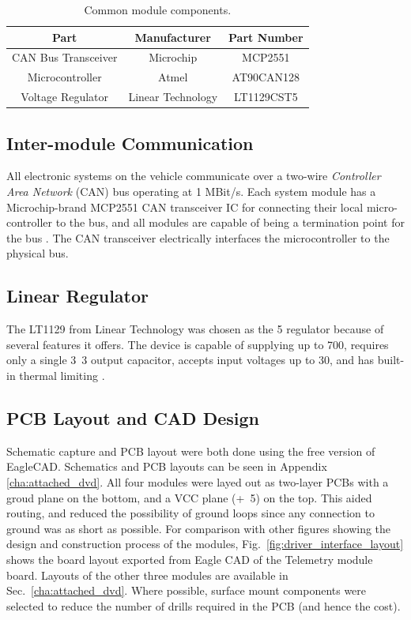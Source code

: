 \begin{table}[H]
	\caption{Common module components.}
	\label{tab:common_module_components}
	\centering
	\begin{tabular}{|c|c|c|}
		\hline 
		Part & Manufacturer & Part Number\tabularnewline 
		\hline \hline
		CAN Bus Transceiver & Microchip & MCP2551\tabularnewline \hline
		Microcontroller & Atmel & AT90CAN128\tabularnewline \hline
		Voltage Regulator & Linear Technology & LT1129CST5\tabularnewline		
		\hline
	\end{tabular}
\end{table}

\subsection{Inter-module Communication\label{sec:inter_module_communication}}


All electronic systems on the vehicle communicate over a two-wire \emph{Controller Area Network} (CAN) bus operating at 1 MBit/s. Each system module has a Microchip-brand MCP2551 CAN transceiver IC for connecting their local micro-controller to the bus, and all modules are capable of being a termination point for the bus \cite{MCP2551}. The CAN transceiver electrically interfaces the microcontroller to the physical bus.

\subsection{Linear Regulator}

The LT1129 from Linear Technology was chosen as the \unit{5}{\volt} regulator because of several features it offers. The device is capable of supplying up to \unit{700}{\milli\ampere}, requires only a single \unit{3.3}{\micro\farad} output capacitor, accepts input voltages up to \unit{30}{\volt}, and has built-in thermal limiting \cite{LTC1129}.

\subsection{PCB Layout and CAD Design}

Schematic capture and PCB layout were both done using the free version of EagleCAD. Schematics and PCB layouts can be seen in Appendix \ref{cha:attached_dvd}. All four modules were layed out as two-layer PCBs with a groud plane on the bottom, and a VCC plane (\unit{+5}{\volt}) on the top. This aided routing, and reduced the possibility of ground loops since any connection to ground was as short as possible. For comparison with other figures showing the design and construction process of the modules, Fig.\ \ref{fig:driver_interface_layout} shows the board layout exported from Eagle CAD of the Telemetry module board. Layouts of the other three modules are available in Sec.\ \ref{cha:attached_dvd}. Where possible, surface mount components were selected to reduce the number of drills required in the PCB (and hence the cost).

